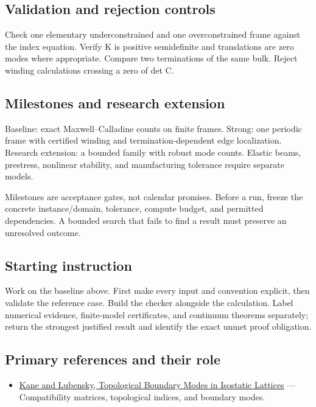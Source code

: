 \documentclass[
  11pt,
]{article}
\providecommand{\tightlist}{%
  \setlength{\itemsep}{0pt}\setlength{\parskip}{0pt}}
\begin{document}
\subsection{Validation and rejection controls}

Check one elementary underconstrained and one overconstrained frame
against the index equation. Verify K is positive semidefinite and
translations are zero modes where appropriate. Compare two terminations
of the same bulk. Reject winding calculations crossing a zero of det C.

\subsection{Milestones and research extension}

Baseline: exact Maxwell--Calladine counts on finite frames. Strong: one
periodic frame with certified winding and termination-dependent edge
localization. Research extension: a bounded family with robust mode
counts. Elastic beams, prestress, nonlinear stability, and manufacturing
tolerance require separate models.

Milestones are acceptance gates, not calendar promises. Before a run,
freeze the concrete instance/domain, tolerance, compute budget, and
permitted dependencies. A bounded search that fails to find a result
must preserve an unresolved outcome.

\subsection{Starting instruction}

Work on the baseline above. First make every input and convention
explicit, then validate the reference case. Build the checker alongside
the calculation. Label numerical evidence, finite-model certificates,
and continuum theorems separately; return the strongest justified result
and identify the exact unmet proof obligation.

\subsection{Primary references and their role}

\begin{itemize}
\tightlist
\item
  \href{https://arxiv.org/abs/1308.0554}{Kane and Lubensky, Topological
  Boundary Modes in Isostatic Lattices} --- Compatibility matrices,
  topological indices, and boundary modes.
\end{itemize}
\end{document}
